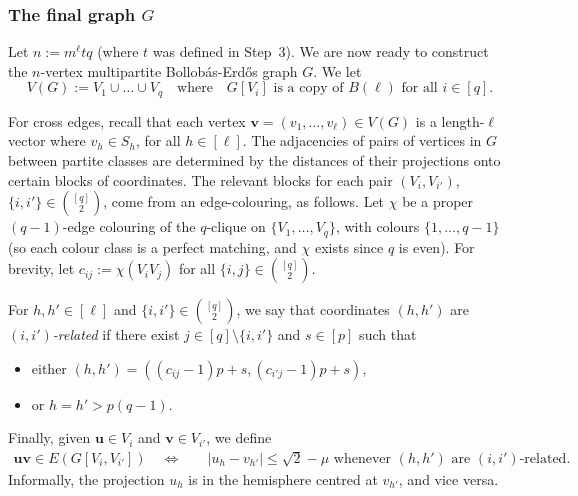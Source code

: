 \documentclass[11pt, a4paper]{article}
\newcommand{\V}[1]{\mathbold{#1}}
\theoremstyle{definition}
\begin{document}

\subsubsection{The final graph $G$}\label{sec-mBE}
Let $n:=m^\ell tq$ (where $t$ was defined in Step~3).
We are now ready to construct the $n$-vertex multipartite Bollob\'as-Erd\H{o}s graph $G$.
We let
$$
V(G) := V_1 \cup \ldots \cup V_q\quad\text{where}\quad G[V_i] \text{ is a copy of }B(\ell) \text{ for all }i \in [q].
$$ %

For cross edges, recall that each vertex $\V{v}=(v_1,\ldots, v_\ell)\in V(G)$ is a length-$\ell$ vector where $v_h\in S_h$, for all $h\in [\ell]$. The adjacencies of pairs of vertices in $G$ between partite classes are determined by the distances of their projections onto certain blocks of coordinates. The relevant blocks for each pair $(V_i,V_{i'})$, $\{i,i'\}\in{[q]\choose 2}$, come from an edge-colouring, as follows. 
Let $\chi$ be a proper $(q-1)$-edge colouring of the $q$-clique on $\lbrace V_1,\ldots,V_q\rbrace$, with colours $\lbrace 1,\ldots,q-1\rbrace$ (so each colour class is a perfect matching, and $\chi$ exists since $q$ is even).
For brevity, let $c_{ij} := \chi(V_iV_j)$ for all $\{i,j\}\in{[q]\choose 2}$.

For $h,h'\in[\ell]$ and $\{i,i'\}\in{[q]\choose 2}$, we say that coordinates $(h,h')$ are \emph{$(i,i')$-related} if there exist $j \in [q]\setminus\lbrace i,i'\rbrace$ and $s \in [p]$ such that 
\begin{itemize}
	\item either $(h,h')=((c_{ij}-1)p+s,(c_{i'j}-1)p+s)$,
	
	\item  or $h = h' > p(q-1)$.
\end{itemize}

Finally, given $\V{u}  \in V_i$ and $\V{v}  \in V_{i'}$, we define
\begin{align*}
\V{u}\V{v} \in E(G[V_i,V_{i'}]) \quad \iff \quad &|u_{h}-v_{h'}| \leq \sqrt{2}-\mu \text{ whenever }(h,h') \text{ are } (i,i')\text{-related}.
\end{align*}
Informally, the projection $u_h$ is in the hemisphere centred at $v_{h'}$, and vice versa.
\end{document}
